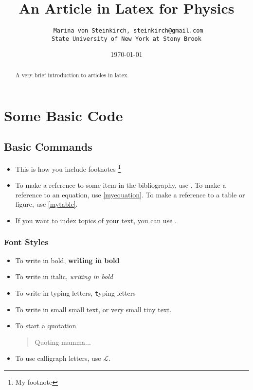\documentclass[10pt]{article} %
\title{An Article in Latex for Physics}
\author{ \texttt{ Marina von Steinkirch, steinkirch@gmail.com}\\
	   \texttt{State University of New York at Stony Brook}}
\date{\today} %
\begin{document}
\maketitle
{} %
\tableofcontents %

\begin{abstract}
A very brief introduction to articles in latex.
\end{abstract}







\section{Some Basic Code} %

\subsection{Basic Commands}

\begin{itemize}
\item This is how you include footnotes \footnote{My footnote}
\item To make a reference to some item in the bibliography, use \cite{steinkirch}. To make a reference to an equation, use \eqref{myequation}. To make a reference to a table or figure, use \ref{mytable}.
\item If you want to index topics of your text, you can use .
\end{itemize}

\subsubsection*{Font Styles}


\begin{itemize}
\item To write in bold, {\bf writing in bold }
\item To write in italic, {\it writing in bold }
\item To write in typing letters, {\texttt typing letters}
\item To write in small {\small small text}, or very small {\tiny tiny text}.
\item To start a quotation \begin{quotation} Quoting mamma... \end{quotation}
\item To use calligraph letters, use $\mathcal{L}$.
\end{itemize}
\end{document}
